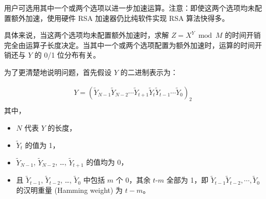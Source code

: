 \documentclass[main\_\_CN.tex]{subfiles}
\begin{document}
用户可选用其中一个或两个选项以进一步加速运算。注意：即使这两个选项均未配置额外加速，使用硬件 RSA 加速器仍比纯软件实现 RSA 算法快得多。


具体来说，当这两个选项均未配置额外加速时，求解 \begin{math}Z = X^{Y} \bmod M\end{math} 的时间开销完全由运算子长度决定。当其中一个或两个选项配置为额外加速时，运算的时间开销还与 \begin{math}Y\end{math} 的 0/1 位分布有关。

为了更清楚地说明问题，首先假设 \begin{math}Y \end{math} 的二进制表示为：

\begin{gather*}
Y = ( \widetilde{Y}_{N-1} \widetilde{Y}_{N-2} \cdots \widetilde{Y}_{t+1} \widetilde{Y}_{t} \widetilde{Y}_{t-1} \cdots \widetilde{Y}_{0} )_{2} \\
\end{gather*}
其中，
\begin{itemize}
    \item \begin{math} N \end{math} 代表 \begin{math}Y \end{math} 的长度，
    \item \begin{math}\widetilde{Y}_{t}\end{math} 的值为 1，
    \item \begin{math}\widetilde{Y}_{N-1}\end{math}, \begin{math}\widetilde{Y}_{N-2}\end{math}, \dots, \begin{math}\widetilde{Y}_{t+1}\end{math} 的值均为 0，
    \item 且 \begin{math}\widetilde{Y}_{t-1}\end{math}, \begin{math}\widetilde{Y}_{t-2}\end{math}, \dots, \begin{math}\widetilde{Y}_{0}\end{math} 中包括 \begin{math}m\end{math} 个 0，其余 \begin{math}t\end{math}-\begin{math}m\end{math} 全部为 1，即 \begin{math}\widetilde{Y}_{t-1} \widetilde{Y}_{t-2}, \cdots, \widetilde{Y}_{0}\end{math} 的汉明重量 (Hamming weight) 为 \begin{math}t -m\end{math}。
\end{itemize}
\end{document}
